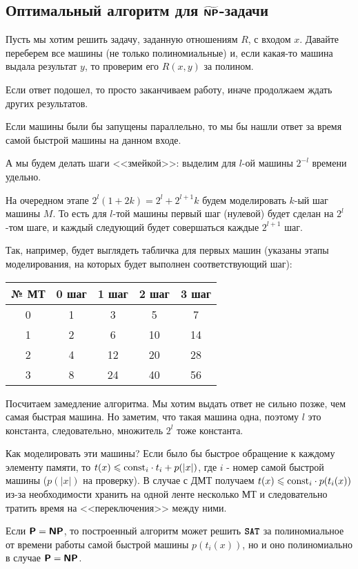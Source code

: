 \subsection{Оптимальный алгоритм для $\widetilde{\textmd{\textbf{\textsf{NP}}}}$-задачи}
Пусть мы хотим решить задачу, заданную отношениям $ R$, с входом $ x$.
Давайте переберем все машины (не только полиномиальные) и, если какая-то машина выдала результат $ y $, то проверим его $ R(x, y)$ за полином.

Если ответ подошел, то просто заканчиваем работу, иначе продолжаем ждать других результатов.

Если машины были бы запущены параллельно, то мы бы нашли ответ за время самой быстрой машины на данном входе.

А мы будем делать шаги <<змейкой>>: выделим для $ l$-ой машины $ 2^{-l}$ времени удельно.

На очередном этапе $ 2^{l}(1 + 2k) = 2^l + 2^{l+1}k$ будем моделировать $ k$-ый шаг машины $ M$. То есть для $l$-той машины первый шаг (нулевой) будет сделан на $2^l$-том шаге, и каждый следующий будет совершаться каждые $2^{l+1}$ шаг.

Так, например, будет выглядеть табличка для первых машин (указаны этапы моделирования, на которых будет выполнен соответствующий шаг):
\begin{center}\begin{tabular}{c|c|c|c|c}
     № МТ & 0 шаг & 1 шаг & 2 шаг & 3 шаг  \\
     \hline 
     0 & 1 & 3 & 5 & 7 \\
     1 & 2 & 6 & 10 & 14 \\
     2 & 4 & 12 & 20 & 28 \\
     3 & 8 & 24 & 40 & 56 
\end{tabular}\end{center}

Посчитаем замедление алгоритма. Мы хотим выдать ответ не сильно позже, чем самая быстрая машина. Но заметим, что такая машина одна, поэтому $ l$ это константа, следовательно, множитель $ 2^{l}$ тоже константа.

Как моделировать эти машины? Если было бы быстрое обращение к каждому элементу памяти, то $ t(x) \leqslant \textmd{const}_i \cdot t_i + p(\lvert x \rvert )$, где $ i$ - номер самой быстрой машины ($ p(\lvert x \rvert )$ на проверку). В случае с ДМТ получаем  $ t(x) \leqslant \textmd{const}_{i}\cdot p(t_i(x))$ из-за необходимости хранить на одной ленте несколько МТ и следовательно тратить время на <<переключения>> между ними.

\begin{note}
	Если $ \textmd{\textbf{\textsf{P}}} = \textmd{\textbf{\textsf{NP}}}$, то построенный алгоритм может решить ${\textbf{\texttt{SAT}}}$ за полиномиальное от времени работы самой быстрой машины  $ p(t_i(x))$, но и оно полиномиально в случае $ \textmd{\textbf{\textsf{P}}} = \textmd{\textbf{\textsf{NP}}}$.
\end{note}

